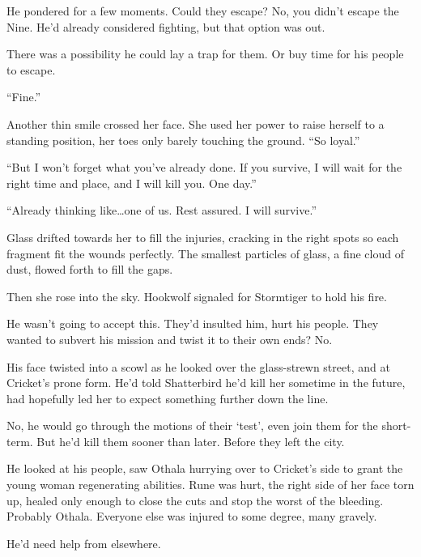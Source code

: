 He pondered for a few moments.  Could they escape?  No, you didn't escape the Nine.  He'd already considered fighting, but that option was out.



There was a possibility he could lay a trap for them.  Or buy time for his people to escape.



``Fine.''



Another thin smile crossed her face.  She used her power to raise herself to a standing position, her toes only barely touching the ground.  ``So loyal.''



``But I won't forget what you've already done.  If you survive, I will wait for the right time and place, and I will kill you.  One day.''



``Already thinking like\ldots one of us.  Rest assured.  I will survive.''



Glass drifted towards her to fill the injuries, cracking in the right spots so each fragment fit the wounds perfectly.  The smallest particles of glass, a fine cloud of dust, flowed forth to fill the gaps.



Then she rose into the sky.  Hookwolf signaled for Stormtiger to hold his fire.



He wasn't going to accept this.  They'd insulted him, hurt his people.  They wanted to subvert his mission and twist it to their own ends?  No.



His face twisted into a scowl as he looked over the glass-strewn street, and at Cricket's prone form.  He'd told Shatterbird he'd kill her sometime in the future, had hopefully led her to expect something further down the line.



No, he would go through the motions of their `test', even join them for the short-term.  But he'd kill them sooner than later.  Before they left the city.



He looked at his people, saw Othala hurrying over to Cricket's side to grant the young woman regenerating abilities.  Rune was hurt, the right side of her face torn up, healed only enough to close the cuts and stop the worst of the bleeding.  Probably Othala.  Everyone else was injured to some degree, many gravely.



He'd need help from elsewhere.





